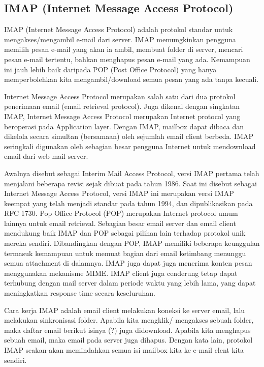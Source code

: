 \subsection {IMAP (Internet Message Access Protocol)}
	 IMAP (Internet Message Access Protocol) adalah protokol standar untuk mengakses/mengambil e-mail dari server. IMAP memungkinkan pengguna memilih pesan e-mail yang akan ia ambil, membuat folder di server, mencari pesan e-mail tertentu, bahkan menghapus pesan e-mail yang ada. Kemampuan ini jauh lebih baik daripada POP (Post Office Protocol) yang hanya memperbolehkan kita mengambil/download semua pesan yang ada tanpa kecuali.\par \vspace{12pt}
	Internet Message Access Protocol merupakan salah satu dari dua protokol penerimaan email (email retrieval protocol). Juga dikenal dengan singkatan IMAP, Internet Message Access Protocol merupakan Internet protocol yang beroperasi pada Application layer. Dengan IMAP, mailbox dapat dibaca dan dikelola secara simultan (bersamaan) oleh sejumlah email client berbeda. IMAP seringkali digunakan oleh sebagian besar pengguna Internet untuk mendownload email dari web mail server.\par \vspace{12pt}
	Awalnya disebut sebagai Interim Mail Access Protocol, versi IMAP pertama telah menjalani beberapa revisi sejak dibuat pada tahun 1986. Saat ini disebut sebagai Internet Message Access Protocol, versi IMAP ini merupakan versi IMAP keempat yang telah menjadi standar pada tahun 1994, dan dipublikasikan pada RFC 1730. Pop Office Protocol (POP) merupakan Internet protocol umum lainnya untuk email retrieval. Sebagian besar email server dan email client mendukung baik IMAP dan POP sebagai pilihan lain terhadap protokol unik mereka sendiri. Dibandingkan dengan POP, IMAP memiliki beberapa keunggulan termasuk kemampuan untuk memuat bagian dari email ketimbang menunggu semua attachment di dalamnya. IMAP juga dapat juga menerima konten pesan menggunakan mekanisme MIME. IMAP client juga cenderung tetap dapat terhubung dengan mail server dalam periode waktu yang lebih lama, yang dapat meningkatkan response time secara keseluruhan. \par \vspace{12pt}
	 Cara kerja IMAP adalah email client melakukan koneksi ke server email, lalu melakukan sinkronisasi folder. Apabila kita mengklik/ mengakses sebuah folder, maka daftar email berikut isinya (?) juga didownload. Apabila kita menghapus sebuah email, maka email pada server juga dihapus. Dengan kata lain, protokol IMAP seakan-akan memindahkan semua isi mailbox kita ke e-mail clent kita sendiri.\par \vspace{12pt}
